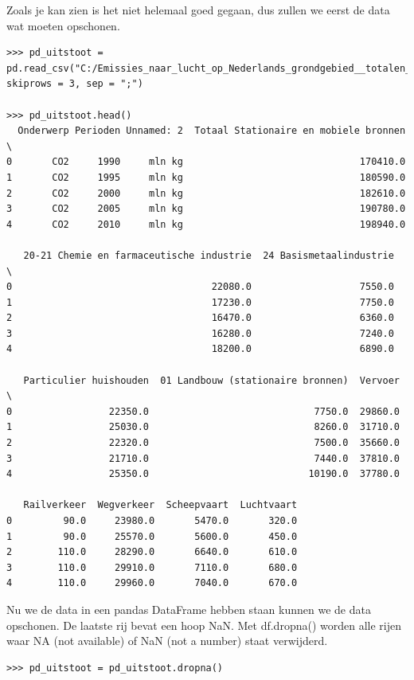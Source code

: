 Zoals je kan zien is het niet helemaal goed gegaan, dus zullen we eerst de data wat moeten opschonen.

\begin{lstlisting}[frame=single]
>>> pd_uitstoot = pd.read_csv("C:/Emissies_naar_lucht_op_Nederlands_grondgebied__totalen_11112018_170037.csv", skiprows = 3, sep = ";")

>>> pd_uitstoot.head()
  Onderwerp Perioden Unnamed: 2  Totaal Stationaire en mobiele bronnen  \
0       CO2     1990     mln kg                               170410.0   
1       CO2     1995     mln kg                               180590.0   
2       CO2     2000     mln kg                               182610.0   
3       CO2     2005     mln kg                               190780.0   
4       CO2     2010     mln kg                               198940.0   

   20-21 Chemie en farmaceutische industrie  24 Basismetaalindustrie  \
0                                   22080.0                   7550.0   
1                                   17230.0                   7750.0   
2                                   16470.0                   6360.0   
3                                   16280.0                   7240.0   
4                                   18200.0                   6890.0   

   Particulier huishouden  01 Landbouw (stationaire bronnen)  Vervoer  \
0                 22350.0                             7750.0  29860.0   
1                 25030.0                             8260.0  31710.0   
2                 22320.0                             7500.0  35660.0   
3                 21710.0                             7440.0  37810.0   
4                 25350.0                            10190.0  37780.0   

   Railverkeer  Wegverkeer  Scheepvaart  Luchtvaart  
0         90.0     23980.0       5470.0       320.0  
1         90.0     25570.0       5600.0       450.0  
2        110.0     28290.0       6640.0       610.0  
3        110.0     29910.0       7110.0       680.0  
4        110.0     29960.0       7040.0       670.0  

\end{lstlisting}

Nu we de data in een pandas DataFrame hebben staan kunnen we de data opschonen. De laatste rij bevat een hoop NaN. Met df.dropna() worden alle rijen waar NA (not available) of NaN (not a number) staat verwijderd.

\begin{lstlisting}[frame=single]
>>> pd_uitstoot = pd_uitstoot.dropna()
\end{lstlisting}

